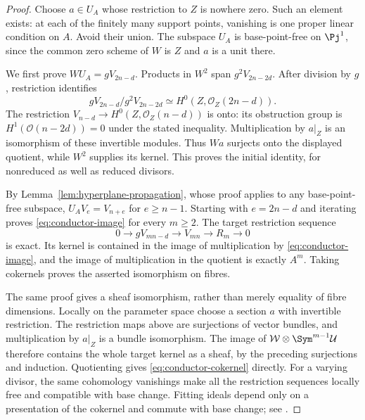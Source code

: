 \begin{proof}
Choose $a\in U_A$ whose restriction to $Z$ is nowhere zero. Such
an element exists: at each of the finitely many support points,
vanishing is one proper linear condition on $A$. Avoid their union.
The subspace $U_A$ is base-point-free on $\Pj^1$, since the common
zero scheme of $W$ is $Z$ and $a$ is a unit there.

We first prove $WU_A=gV_{2n-d}$. Products in $W^2$ span
$g^2V_{2n-2d}$. After division by $g$, restriction identifies
\[
 gV_{2n-d}/g^2V_{2n-2d}
 \simeq H^0(Z,\mathcal O_Z(2n-d)).
\]
The restriction $V_{n-d}\to H^0(Z,\mathcal O_Z(n-d))$ is onto:
its obstruction group is $H^1(\mathcal O(n-2d))=0$ under the
stated inequality. Multiplication by $a|_Z$ is an isomorphism of
these invertible modules. Thus $Wa$ surjects onto the displayed
quotient, while $W^2$ supplies its kernel. This proves the initial
identity, for nonreduced as well as reduced divisors.

By Lemma~\ref{lem:hyperplane-propagation}, whose proof applies to
any base-point-free subspace, $U_AV_e=V_{n+e}$ for $e\ge n-1$.
Starting with $e=2n-d$ and iterating proves
\eqref{eq:conductor-image} for every $m\ge2$.
The target restriction sequence
\[
 0\longrightarrow gV_{mn-d}\longrightarrow V_{mn}
       \longrightarrow R_m\longrightarrow0
\]
is exact. Its kernel is contained in the image of multiplication
by \eqref{eq:conductor-image}, and the image of multiplication
in the quotient is exactly $A^m$. Taking cokernels proves the
asserted isomorphism on fibres.

The same proof gives a sheaf isomorphism, rather than merely equality
of fibre dimensions. Locally on the parameter space choose a section
$a$ with invertible restriction. The restriction maps above are
surjections of vector bundles, and multiplication by $a|_Z$ is a
bundle isomorphism. The image of
$\mathcal W\otimes\Sym^{m-1}\mathcal U$ therefore contains the
whole target kernel as a sheaf, by the preceding surjections and
induction. Quotienting gives \eqref{eq:conductor-cokernel} directly.
For a varying divisor, the same cohomology vanishings make all the
restriction sequences locally free and compatible with base change.
Fitting ideals depend only on a presentation of the cokernel and
commute with base change; see \cite[Tags 07Z8, 07ZA]{StacksFitting}.
\end{proof}

